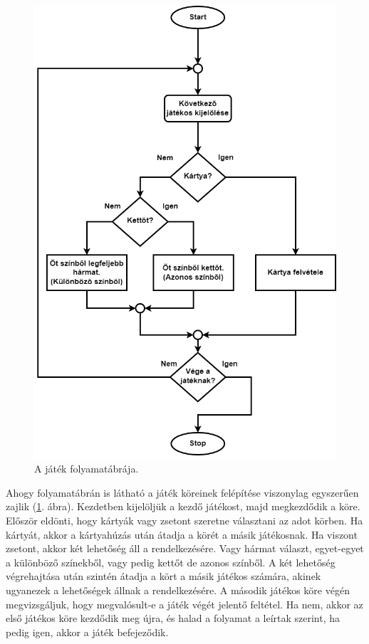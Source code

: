 

\begin{figure}[h]
\centering
\includegraphics[scale=0.3]{images/flowchart.png}
\caption{A játék folyamatábrája.}
\label{fig:flowchart}
\end{figure}


Ahogy folyamatábrán is látható a játék köreinek felépítése viszonylag egyszerűen zajlik (\ref{fig:flowchart}. ábra). Kezdetben kijelöljük a kezdő játékost, majd megkezdődik a köre. Először eldönti, hogy kártyák vagy zsetont szeretne választani az adot körben. Ha kártyát, akkor a kártyahúzás után átadja a körét a másik játékosnak. Ha viszont zsetont, akkor két lehetőség áll a rendelkezésére. Vagy hármat választ, egyet-egyet a különböző színekből, vagy pedig kettőt de azonos színből. A két lehetőség végrehajtása után szintén átadja a kört a másik játékos számára, akinek ugyanezek a lehetőségek állnak a rendelkezésére. A második játékos köre végén megvizsgáljuk, hogy megvalósult-e a játék végét jelentő feltétel. Ha nem, akkor az első játékos köre kezdődik meg újra, és halad a folyamat a leírtak szerint, ha pedig igen, akkor a játék befejeződik.


